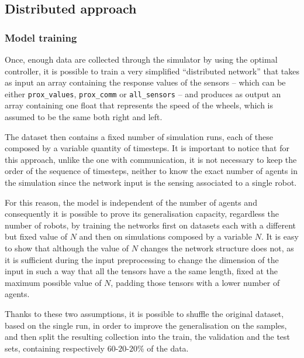 \subsection{Distributed approach}
\label{subsec:ex1distr}

\subsubsection{Model training}
\label{subsubsec:learneddist}

Once, enough data are collected through the simulator by using the optimal 
controller, it is possible to train a very simplified ``distributed network'' 
that takes as input an array containing the response values of the sensors – 
which can be either \texttt{prox\_values}, \texttt{prox\_comm} or 
\texttt{all\_sensors} – and produces as output an array containing one float 
that represents the speed of the wheels, which is assumed to be the same 
both right and left.

The dataset then contains a fixed number of simulation runs, each of these 
composed by a variable quantity of timesteps. It is important to notice that 
for this approach, unlike the one with communication, it is not necessary to 
keep the order of the sequence of timesteps, neither to know the exact 
number of agents in the simulation since the network input is the sensing 
associated to a single robot.

For this reason, the model is independent of the number of agents and 
consequently it is possible to prove its generalisation capacity, regardless 
the number of robots, by training the networks first on datasets each with a 
different but fixed value of $N$ and then on simulations composed by a 
variable $N$.
It is easy to show that although the value of $N$ changes the network 
structure does not, as it is sufficient during the input preprocessing to 
change the dimension of the input in such a way that all the tensors have a 
the same length, fixed at the maximum possible value of $N$, padding 
those tensors with a lower number of agents.

Thanks to these two assumptions, it is possible to shuffle the original 
dataset, based on the single run, in order to improve the generalisation on 
the samples, and then split the resulting collection into the train, the 
validation and the test sets, containing respectively $60$-$20$-$20\%$ of 
the data. 

